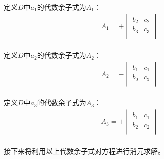 \documentclass[UTF8]{ctexart}
\begin{document}
    定义$D$中$a_1$的代数余子式为$A_1$：
    \begin{align}
        A_1=+
        \begin{vmatrix}
            b_2&c_2\\
            b_3&c_3\\
        \end{vmatrix}
    \end{align}\\
    定义$D$中$a_2$的代数余子式为$A_2$：
    \begin{align}
        A_2=-
        \begin{vmatrix}
            b_1&c_1\\
            b_3&c_3\\
        \end{vmatrix}
    \end{align}\\
    定义$D$中$a_3$的代数余子式为$A_3$：
    \begin{align}
        A_3=+
        \begin{vmatrix}
            b_1&c_1\\
            b_2&c_2\\
        \end{vmatrix}
    \end{align}\\
    接下来将利用以上代数余子式对方程进行消元求解。
\end{document}
